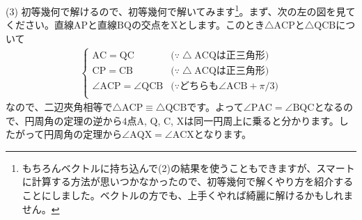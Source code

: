 \noindent (3) 初等幾何で解けるので、初等幾何で解いてみます\footnote{もちろんベクトルに持ち込んで(2)の結果を使うこともできますが、スマートに計算する方法が思いつかなかったので、初等幾何で解くやり方を紹介することにしました。ベクトルの方でも、上手くやれば綺麗に解けるかもしれません。}。まず、次の左の図を見てください。直線$\mathrm{AP}$と直線$\mathrm{BQ}$の交点を$\mathrm{X}$とします。このとき$\bigtriangleup\mathrm{ACP}$と$\bigtriangleup\mathrm{QCB}$について
\begin{align*}
\begin{cases}
\mathrm{AC} = \mathrm{QC} & \text{($\because\bigtriangleup\mathrm{ACQ}$は正三角形)} \\
\mathrm{CP} = \mathrm{CB} & \text{($\because\bigtriangleup\mathrm{ACQ}$は正三角形)} \\
\angle\mathrm{ACP} = \angle\mathrm{QCB} & \text{($\because$どちらも$\angle\mathrm{ACB} + \pi/3$)} \\
\end{cases}
\end{align*}
なので、二辺夾角相等で$\bigtriangleup\mathrm{ACP} \equiv \bigtriangleup\mathrm{QCB}$です。よって$\angle\mathrm{PAC} = \angle\mathrm{BQC}$となるので、円周角の定理の逆から$4$点$\mathrm{A}$, $\mathrm{Q}$, $\mathrm{C}$, $\mathrm{X}$は同一円周上に乗ると分かります。したがって円周角の定理から$\angle\mathrm{AQX} = \angle\mathrm{ACX}$となります。

